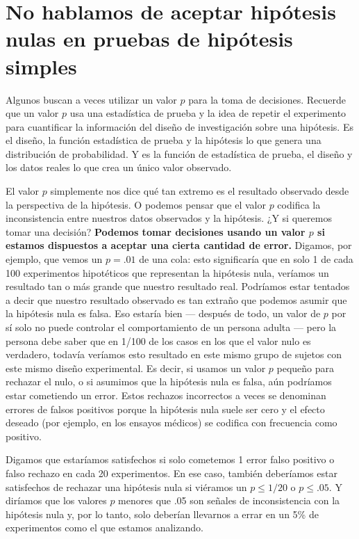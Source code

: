 \documentclass[
]{article}
\begin{document}
\hypertarget{no-hablamos-de-aceptar-hipuxf3tesis-nulas-en-pruebas-de-hipuxf3tesis-simples}{%
\section{No hablamos de aceptar hipótesis nulas en pruebas de hipótesis simples}\label{no-hablamos-de-aceptar-hipuxf3tesis-nulas-en-pruebas-de-hipuxf3tesis-simples}}

Algunos buscan a veces utilizar un valor \(p\) para la toma de decisiones. Recuerde que un valor \(p\) usa una estadística de prueba y la idea de repetir el experimento para cuantificar la información del diseño de investigación sobre una hipótesis. Es el diseño, la función estadística de prueba y la hipótesis lo que genera una distribución de probabilidad. Y es la función de estadística de prueba, el diseño y los datos reales lo que crea un único valor observado.

El valor \(p\) simplemente nos dice qué tan extremo es el resultado observado desde la perspectiva de la hipótesis. O podemos pensar que el valor \(p\) codifica la inconsistencia entre nuestros datos observados y la hipótesis. ¿Y si queremos tomar una decisión? \textbf{Podemos tomar decisiones usando un valor \(p\) si estamos dispuestos a aceptar una cierta cantidad de error.} Digamos, por ejemplo, que vemos un \(p = .01\) de una cola: esto significaría que en solo 1 de cada 100 experimentos hipotéticos que representan la hipótesis nula, veríamos un resultado tan o más grande que nuestro resultado real. Podríamos estar tentados a decir que nuestro resultado observado es tan extraño que podemos asumir que la hipótesis nula es falsa. Eso estaría bien --- después de todo, un valor de \(p\) por sí solo no puede controlar el comportamiento de un persona adulta --- pero la persona debe saber que en 1/100 de los casos en los que el valor nulo es verdadero, todavía veríamos esto resultado en este mismo grupo de sujetos con este mismo diseño experimental. Es decir, si usamos un valor \(p\) pequeño para rechazar el nulo, o si asumimos que la hipótesis nula es falsa, aún podríamos estar cometiendo un error. Estos rechazos incorrectos a veces se denominan errores de falsos positivos porque la hipótesis nula suele ser cero y el efecto deseado (por ejemplo, en los ensayos médicos) se codifica con frecuencia como positivo.

Digamos que estaríamos satisfechos si solo cometemos 1 error falso positivo o falso rechazo en cada 20 experimentos. En ese caso, también deberíamos estar satisfechos de rechazar una hipótesis nula si viéramos un \(p \le 1/20\) o \(p \le .05\). Y diríamos que los valores \(p\) menores que .05 son señales de inconsistencia con la hipótesis nula y, por lo tanto, solo deberían llevarnos a errar en un 5\% de experimentos como el que estamos analizando.
\end{document}
